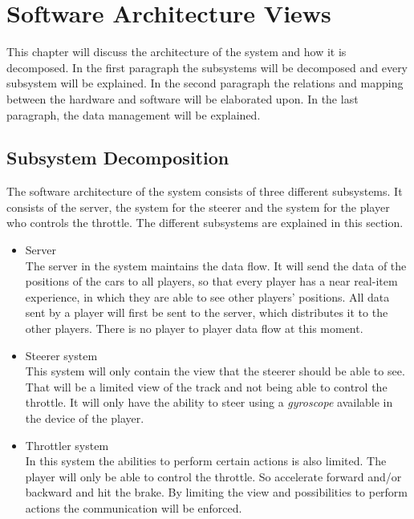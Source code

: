 \documentclass[11pt,twoside,a4paper]{article}
\begin{document}
\newpage

\section{Software Architecture Views}
This chapter will discuss the architecture of the system and how it is decomposed. In the first paragraph the subsystems will be decomposed and every subsystem will be explained. In the second paragraph the relations and mapping between the hardware and software will be elaborated upon. In the last paragraph, the data management will be explained.

\subsection{Subsystem Decomposition}
The software architecture of the system consists of three different subsystems. It consists of the server, the system for the steerer and the system for the player who controls the throttle. The different subsystems are explained in this section.\\
\begin{itemize}
\item Server \hfill \\
    The server in the system maintains the data flow. It will send the data of the positions of the cars to all players, so that every player has a near real-item experience, in which they are able to see other players' positions. All data sent by a player will first be sent to the server, which distributes it to the other players. There is no player to player data flow at this moment. \\
    
\item Steerer system \hfill \\
    This system will only contain the view that the steerer should be able to see. That will be a limited view of the track and not being able to control the throttle. It will only have the ability to steer using a \emph{gyroscope} available in the device of the player. \\
    
\item Throttler system \hfill \\
    In this system the abilities to perform certain actions is also limited. The player will only be able to control the throttle. So accelerate forward and/or backward and hit the brake. By limiting the view and possibilities to perform actions the communication will be enforced. \\

\end{itemize}
\end{document}
